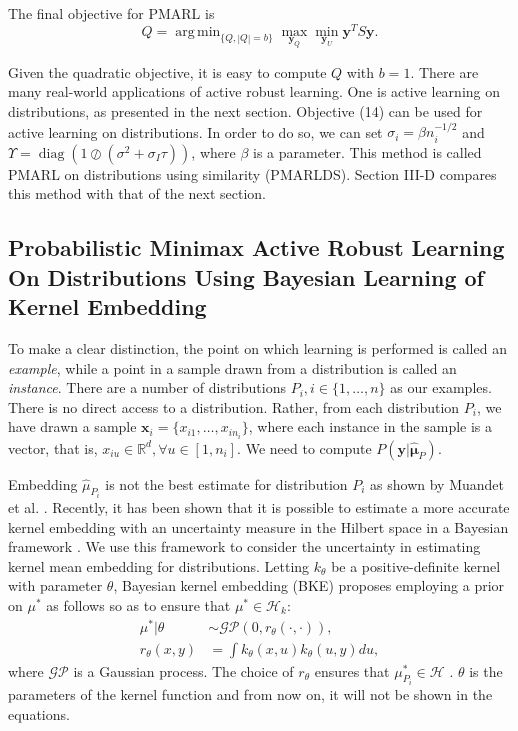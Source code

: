 \documentclass[10pt,twocolumn]{IEEEtran}
\DeclareMathOperator*{\argmin}{arg\,min}
\DeclareMathOperator{\diag}{diag}
\begin{document}
	The final objective for PMARL is
	\begin{equation}
		Q = \argmin_{\{Q, |Q|=b\}} \max_{\mathbf{y}_Q} \min_{\mathbf{y}_U} \mathbf{y}^T S \mathbf{y}.
	\end{equation}
	
	Given the quadratic objective, it is easy to compute $Q$ with $b = 1$. There are many real-world applications of active robust learning. One is active learning on distributions, as presented in the next section. Objective (14) can be used for active learning on distributions. In order to do so, we can set $\sigma_i = \beta n_i^{-1/2}$ and $\Upsilon = \diag(1 \oslash (\sigma^2 + \sigma_I \tau))$, where $\beta$ is a parameter. This method is called PMARL on distributions using similarity (PMARLDS). Section III-D compares this method with that of the next section.
	
	\subsection{Probabilistic Minimax Active Robust Learning On Distributions Using Bayesian Learning of Kernel Embedding}
	
	To make a clear distinction, the point on which learning is performed is called an \emph{example}, while a point in a sample drawn from a distribution is called an \emph{instance}. There are a number of distributions $P_i, i \in \{1, \ldots, n\}$ as our examples. There is no direct access to a distribution. Rather, from each distribution $P_i$, we have drawn a sample $\mathbf{x}_i = \{x_{i1}, \ldots, x_{i n_i}\}$, where each instance in the sample is a vector, that is, $x_{iu} \in \mathbb{R}^d, \forall u \in [1, n_i]$. We need to compute $P(\mathbf{y}|\hat{\boldsymbol{\mu}}_P)$.
	
	Embedding $\hat{\mu}_{P_i}$ is not the best estimate for distribution $P_i$ as shown by Muandet et al. \cite{muandet2017kernel}. Recently, it has been shown that it is possible to estimate a more accurate kernel embedding with an uncertainty measure in the Hilbert space in a Bayesian framework \cite{flaxman2016bayesian}. We use this framework to consider the uncertainty in estimating kernel mean embedding for distributions. Letting $k_\theta$ be a positive-definite kernel with parameter $\theta$, Bayesian kernel embedding (BKE) \cite{flaxman2016bayesian} proposes employing a prior on $\mu^*$ as follows so as to ensure that $\mu^* \in \mathcal{H}_k$:
	\begin{align}
		\mu^*|\theta &\sim \mathcal{GP}(0, r_\theta(\cdot, \cdot)), \\
		r_\theta(x, y) &= \int k_\theta(x, u) k_\theta(u, y) du,
	\end{align}
	where $\mathcal{GP}$ is a Gaussian process. The choice of $r_\theta$ ensures that $\mu^*_{P_i} \in \mathcal{H}$ \cite{flaxman2016bayesian}. $\theta$ is the parameters of the kernel function and from now on, it will not be shown in the equations.
	
\end{document}
